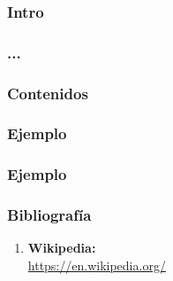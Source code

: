 \documentclass[10pt]{beamer}
\title{}
\subtitle{Arboles C4.5 y C5 y otros}
\date{}
\author{Luis María Costero Valero\\Jesús Javier Domenech Arellano}
\institute{Enero 2016}
\begin{document}
\maketitle




\begin{frame}
  \frametitle{Intro}
\end{frame}

\begin{frame}
  \frametitle{...}
\end{frame}


\begin{frame}
  \frametitle{Contenidos}
\end{frame}

\begin{frame}[fragile] %
  \frametitle{Ejemplo}
\end{frame}

\begin{frame}[fragile] %
  \frametitle{Ejemplo}
\end{frame}

\begin{frame}
  \frametitle{Bibliografía}
  
  \begin{enumerate}
  \item \textbf{Wikipedia:}\\\url{https://en.wikipedia.org/}
  \end{enumerate}
\end{frame}
\end{document}
